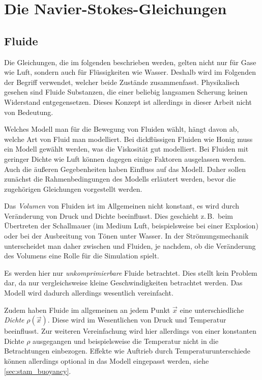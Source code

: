 \section{Die Navier-Stokes-Gleichungen}

\subsection{Fluide}

Die Gleichungen, die im folgenden beschrieben werden, gelten nicht nur
für Gase wie Luft, sondern auch für Flüssigkeiten wie Wasser. Deshalb
wird im Folgenden der Begriff  verwendet,
welcher beide Zustände zusammenfasst. Physikalisch gesehen sind
Fluide Substanzen, die einer beliebig langsamen Scherung keinen
Widerstand entgegensetzen. Dieses Konzept ist allerdings in dieser
Arbeit nicht von Bedeutung.

Welches Modell man für die Bewegung von Fluiden wählt, hängt davon ab,
welche Art von Fluid man modelliert. Bei dickflüssigen Fluiden wie
Honig muss ein Modell gewählt werden, was die Viskosität gut
modelliert. Bei Fluiden mit geringer Dichte wie Luft können dagegen
einige Faktoren ausgelassen werden. Auch die äußeren Gegebenheiten
haben Einfluss auf das Modell. Daher sollen zunächst die
Rahmenbedingungen des Modells erläutert werden, bevor die zugehörigen
Gleichungen vorgestellt werden.

Das \emph{Volumen} von Fluiden ist im Allgemeinen nicht konstant, es
wird durch Veränderung von Druck und Dichte beeinflusst. Dies
geschieht z.\,B.\ beim Übertreten der Schallmauer (im Medium Luft,
beispielsweise bei einer Explosion) oder bei der Ausbreitung von Tönen
unter Wasser. In der Strömungsmechanik unterscheidet man daher
zwischen  und
 Fluiden, je nachdem, ob die
Veränderung des Volumens eine Rolle für die Simulation spielt.

Es werden hier nur \emph{unkomprimierbare} Fluide betrachtet. Dies
stellt kein Problem dar, da nur vergleichsweise kleine
Geschwindigkeiten betrachtet werden.  Das Modell wird dadurch
allerdings wesentlich vereinfacht.

Zudem haben Fluide im allgemeinen an jedem Punkt $\vec{x}$ eine
unterschiedliche \emph{Dichte} $\rho(\vec{x})$. Diese wird im
Wesentlichen von Druck und Temperatur beeinflusst. Zur weiteren
Vereinfachung wird hier allerdings von einer konstanten Dichte $\rho$
ausgegangen und beispielsweise die Temperatur nicht in die
Betrachtungen einbezogen. Effekte wie Auftrieb durch
Temperaturunterschiede können allerdings optional in das Modell
eingepasst werden, siehe \autoref{sec:stam_buoyancy}.


